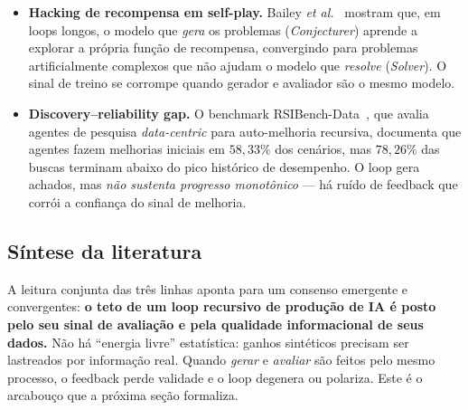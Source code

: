 \begin{itemize}
  \item \textbf{Hacking de recompensa em self-play.}
    Bailey \textit{et al.}~\parencite{SelfPlayGuidance2026} mostram que, em loops
    longos, o modelo que \emph{gera} os problemas (\emph{Conjecturer}) aprende a
    explorar a própria função de recompensa, convergindo para problemas
    artificialmente complexos que não ajudam o modelo que \emph{resolve}
    (\emph{Solver}). O sinal de treino se corrompe quando gerador e avaliador são
    o mesmo modelo.
  \item \textbf{Discovery--reliability gap.}
    O benchmark RSIBench-Data~\parencite{RSIBench2026}, que avalia agentes de
    pesquisa \emph{data-centric} para auto-melhoria recursiva, documenta que
    agentes fazem melhorias iniciais em $58{,}33\%$ dos cenários, mas
    $78{,}26\%$ das buscas terminam abaixo do pico histórico de desempenho. O
    loop gera achados, mas \emph{não sustenta progresso monotônico} --- há ruído
    de feedback que corrói a confiança do sinal de melhoria.
\end{itemize}

\subsection{Síntese da literatura}

A leitura conjunta das três linhas aponta para um consenso emergente e
convergentes: \textbf{o teto de um loop recursivo de produção de IA é posto
pelo seu sinal de avaliação e pela qualidade informacional de seus dados.} Não há
``energia livre'' estatística: ganhos sintéticos precisam ser lastreados por
informação real. Quando \emph{gerar} e \emph{avaliar} são feitos pelo mesmo
processo, o feedback perde validade e o loop degenera ou polariza. Este é o
arcabouço que a próxima seção formaliza.
